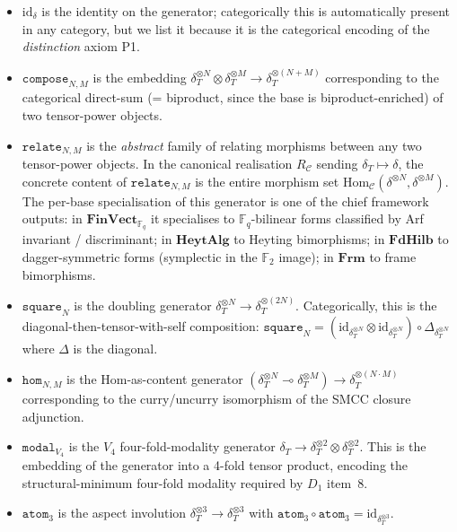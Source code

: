 \documentclass[11pt,a4paper]{article}
\theoremstyle{plain}
\theoremstyle{definition}
\theoremstyle{remark}
\newcommand{\F}{\mathbb{F}}
\newcommand{\cat}[1]{\mathbf{#1}}
\newcommand{\HeytAlg}{\cat{HeytAlg}}
\newcommand{\FdHilb}{\cat{FdHilb}}
\newcommand{\Frm}{\cat{Frm}}
\newcommand{\FinVect}{\cat{FinVect}}
\newcommand{\Hom}{\mathrm{Hom}}
\newcommand{\id}{\mathrm{id}}
\newcommand{\smcc}{SMCC}
\begin{document}
\begin{itemize}[leftmargin=*]
\item $\id_\delta$ is the identity on the generator; categorically this is automatically present in any category, but we list it because it is the categorical encoding of the \emph{distinction} axiom P1.

\item $\mathtt{compose}_{N,M}$ is the embedding $\delta_T^{\otimes N} \otimes \delta_T^{\otimes M} \to \delta_T^{\otimes(N+M)}$ corresponding to the categorical direct-sum (= biproduct, since the base is biproduct-enriched) of two tensor-power objects.

\item $\mathtt{relate}_{N,M}$ is the \emph{abstract} family of relating morphisms between any two tensor-power objects. In the canonical realisation $R_{\mathcal{C}}$ sending $\delta_T \mapsto \delta$, the concrete content of $\mathtt{relate}_{N,M}$ is the entire morphism set $\Hom_{\mathcal{C}}(\delta^{\otimes N}, \delta^{\otimes M})$. The per-base specialisation of this generator is one of the chief framework outputs: in $\FinVect_{\F_q}$ it specialises to $\F_q$-bilinear forms classified by Arf invariant / discriminant; in $\HeytAlg$ to Heyting bimorphisms; in $\FdHilb$ to dagger-symmetric forms (symplectic in the $\F_2$ image); in $\Frm$ to frame bimorphisms.

\item $\mathtt{square}_N$ is the doubling generator $\delta_T^{\otimes N} \to \delta_T^{\otimes(2N)}$. Categorically, this is the diagonal-then-tensor-with-self composition: $\mathtt{square}_N = (\id_{\delta_T^{\otimes N}} \otimes \id_{\delta_T^{\otimes N}}) \circ \Delta_{\delta_T^{\otimes N}}$ where $\Delta$ is the diagonal.

\item $\mathtt{hom}_{N,M}$ is the Hom-as-content generator $(\delta_T^{\otimes N} \multimap \delta_T^{\otimes M}) \to \delta_T^{\otimes(N\cdot M)}$ corresponding to the curry/uncurry isomorphism of the \smcc{} closure adjunction.

\item $\mathtt{modal}_{V_4}$ is the $V_4$ four-fold-modality generator $\delta_T \to \delta_T^{\otimes 2} \otimes \delta_T^{\otimes 2}$. This is the embedding of the generator into a 4-fold tensor product, encoding the structural-minimum four-fold modality required by $D_1$ item~8.

\item $\mathtt{atom}_3$ is the aspect involution $\delta_T^{\otimes 3} \to \delta_T^{\otimes 3}$ with $\mathtt{atom}_3 \circ \mathtt{atom}_3 = \id_{\delta_T^{\otimes 3}}$.


\end{itemize}
\end{document}

